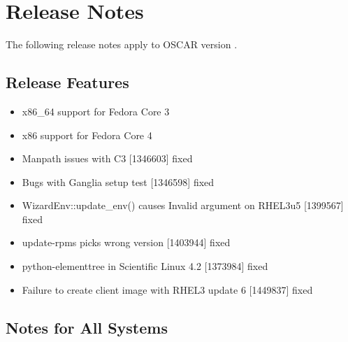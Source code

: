 %
%
%


\section{Release Notes}
\label{sec:release-notes}

The following release notes apply to OSCAR version \oscarversion.
\subsection{Release Features}
\label{subsec:release-features}

\begin{itemize}

\item x86\_64 support for Fedora Core 3
\item x86 support for Fedora Core 4
\item Manpath issues with C3 [1346603] fixed
\item Bugs with Ganglia setup test [1346598] fixed
\item WizardEnv::update\_env() causes Invalid argument on RHEL3u5 [1399567] fixed
\item update-rpms picks wrong version [1403944] fixed
\item python-elementtree in Scientific Linux 4.2 [1373984] fixed
\item Failure to create client image with RHEL3 update 6 [1449837] fixed

\end{itemize}

\subsection{Notes for All Systems}
\label{subsec:release-notes}


